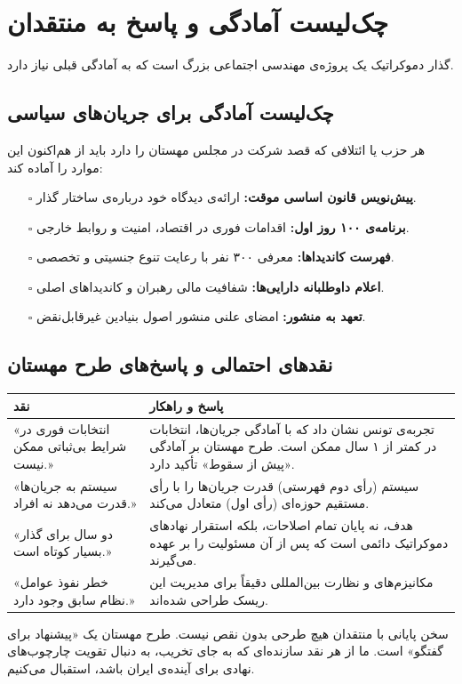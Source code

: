 \chapter{چک‌لیست آمادگی و پاسخ به منتقدان}
\label{app:checklist}

گذار دموکراتیک یک پروژه‌ی مهندسی اجتماعی بزرگ است که به آمادگی قبلی نیاز دارد.

\section{چک‌لیست آمادگی برای جریان‌های سیاسی}

هر حزب یا ائتلافی که قصد شرکت در مجلس مهستان را دارد باید از هم‌اکنون این موارد را آماده کند:

\begin{itemize}
    \item[$\square$] \textbf{پیش‌نویس قانون اساسی موقت:} ارائه‌ی دیدگاه خود درباره‌ی ساختار گذار.
    \item[$\square$] \textbf{برنامه‌ی ۱۰۰ روز اول:} اقدامات فوری در اقتصاد، امنیت و روابط خارجی.
    \item[$\square$] \textbf{فهرست کاندیداها:} معرفی ۳۰۰ نفر با رعایت تنوع جنسیتی و تخصصی.
    \item[$\square$] \textbf{اعلام داوطلبانه دارایی‌ها:} شفافیت مالی رهبران و کاندیداهای اصلی.
    \item[$\square$] \textbf{تعهد به منشور:} امضای علنی منشور اصول بنیادین غیرقابل‌نقض.
\end{itemize}

\section{نقدهای احتمالی و پاسخ‌های طرح مهستان}

\begin{center}
\begin{tabular}{R{5cm} L{9cm}}
\hline
\textbf{نقد} & \textbf{پاسخ و راهکار} \\
\hline
«انتخابات فوری در شرایط بی‌ثباتی ممکن نیست.» & تجربه‌ی تونس نشان داد که با آمادگی جریان‌ها، انتخابات در کمتر از ۱ سال ممکن است. طرح مهستان بر آمادگی «پیش از سقوط» تأکید دارد. \\
«سیستم به جریان‌ها قدرت می‌دهد نه افراد.» & سیستم  (رأی دوم فهرستی) قدرت جریان‌ها را با رأی مستقیم حوزه‌ای (رأی اول) متعادل می‌کند. \\
«دو سال برای گذار بسیار کوتاه است.» & هدف، نه پایان تمام اصلاحات، بلکه استقرار نهادهای دموکراتیک دائمی است که پس از آن مسئولیت را بر عهده می‌گیرند. \\
«خطر نفوذ عوامل نظام سابق وجود دارد.» & مکانیزم‌های  و نظارت بین‌المللی دقیقاً برای مدیریت این ریسک طراحی شده‌اند. \\
\hline
\end{tabular}
\end{center}

\begin{modernbox}{سخن پایانی با منتقدان}
هیچ طرحی بدون نقص نیست. طرح مهستان یک «پیشنهاد برای گفتگو» است. ما از هر نقد سازنده‌ای که به جای تخریب، به دنبال تقویت چارچوب‌های نهادی برای آینده‌ی ایران باشد، استقبال می‌کنیم.
\end{modernbox}

